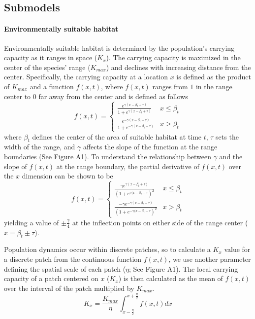 \documentclass[11pt]{article}
\begin{document}
\subsection*{Submodels}
\paragraph{Environmentally suitable habitat}
Environmentally suitable habitat is determined by the population's carrying capacity as it ranges in space ($K_{x}$). The carrying capacity is maximized in the center of the species' range ($K_{max}$) and declines with increasing distance from the center. Specifically, the carrying capacity at a location $x$ is defined as the product of $K_{max}$ and a function $f(x,t)$, where $f(x,t)$ ranges from $1$ in the range center to $0$ far away from the center and is defined as follows 
\begin{equation}
f(x,t)=
\begin{cases}
	\frac{e^{\gamma(x-\beta_{t}+\tau)}}{1+e^{\gamma(x-\beta_{t}+\tau)}} & x \leq \beta_{t} \\
	\frac{e^{-\gamma(x-\beta_{t}-\tau)}}{1+e^{-\gamma(x-\beta_{t}-\tau)}} & x > \beta_{t}
\end{cases}
\end{equation}
where $\beta_{t}$ defines the center of the area of suitable habitat at time $t$, $\tau$ sets the width of the range, and $\gamma$ affects the slope of the function at the range boundaries (See Figure A1). To understand the relationship between $\gamma$ and the slope of $f(x,t)$ at the range boundary, the partial derivative of $f(x,t)$ over the $x$ dimension can be shown to be
\begin{equation}
f(x,t)=
\begin{cases}
	\frac{\gamma e^{\gamma(x-\beta_{t}+\tau)}}{(1+e^{\gamma(x-\beta_{t}+\tau})^{2}} & x \leq \beta_{t} \\
	\frac{-\gamma e^{-\gamma(x-\beta_{t}-\tau)}}{(1+e^{-\gamma(x-\beta_{t}-\tau})^{2}} & x > \beta_{t}
\end{cases}	
\end{equation}
yielding a value of $\pm\frac{\gamma}{4}$ at the inflection points on either side of the range center ($x=\beta_{t}\pm\tau$).

Population dynamics occur within discrete patches, so to calculate a $K_{x}$ value for a discrete patch from the continuous function $f(x,t)$, we use another parameter defining the spatial scale of each patch ($\eta$; See Figure A1). The local carrying capacity of a patch centered on $x$ ($K_{x}$) is then calculated as the mean of $f(x,t)$ over the interval of the patch multiplied by $K_{max}$.
\begin{equation}
K_{x} = \frac{K_{max}}{\eta}\int_{x-\frac{\eta}{2}}^{x+\frac{\eta}{2}}f(x,t)dx
\end{equation}
\end{document}
